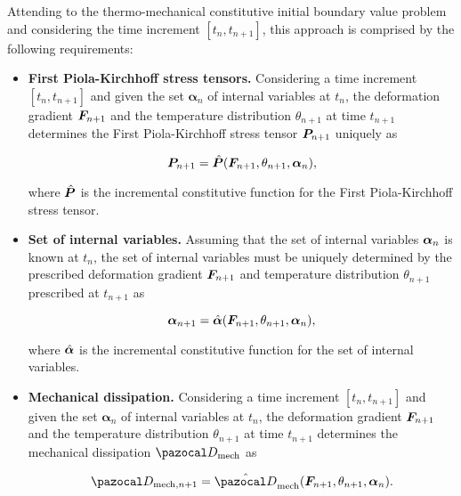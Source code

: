 Attending to the thermo-mechanical constitutive initial boundary value problem and considering the time increment $[t_n, t_{n+1}]$, this approach is comprised by the following requirements:
\begin{itemize}
    \item \textbf{First Piola-Kirchhoff stress tensors.} Considering a time increment $[t_n, t_{n+1}]$ and given the set $\bm \alpha_n$ of internal variables at $t_n$, the deformation gradient $\bm{F}_{n+1}$ and the temperature distribution \(\theta_{n+1}\) at time $t_{n+1}$ determines the First Piola-Kirchhoff stress tensor $\bm{P}_{n+1}$ uniquely as
        \begin{highlight}
    \begin{equation}
        \bm{P}_{n+1} = \hat{\bm{P}}(\bm{F}_{n+1}, \theta_{n+1}, \bm{\alpha}_n),
    \end{equation}
        \end{highlight}
    where $\hat{\bm{P}}$ is the incremental constitutive function for the First Piola-Kirchhoff stress tensor.
    \item \textbf{Set of internal variables.} Assuming that the set of internal variables $\bm{\alpha}_n$ is known at $t_n$, the set of internal variables must be uniquely determined by the prescribed deformation gradient $\bm{F}_{n+1}$ and temperature distribution \(\theta_{n+1}\) prescribed at $t_{n+1}$ as
    \begin{highlight}
        \begin{equation}
             \bm{\alpha}_{n+1} =\hat{\bm{\alpha}}(\bm{F}_{n+1}, \theta_{n+1}, \bm{\alpha}_n), \label{eq:incremental_flux}
        \end{equation}
    \end{highlight}
    where $\hat{\bm{\alpha}}$ is the incremental constitutive function for the set of internal variables.

    \item \textbf{Mechanical dissipation.} 
 Considering a time increment $[t_n, t_{n+1}]$ and given the set $\bm \alpha_n$ of internal variables at $t_n$, the deformation gradient $\bm{F}_{n+1}$ and the temperature distribution \(\theta_{n+1}\) at time $t_{n+1}$ determines the mechanical dissipation \(\pazocal D_\text{mech}\) as
    \begin{highlight}
    \begin{equation}
    \pazocal D_{\text{mech},n+1} = \hat{\pazocal D}_\text{mech}(\bm F_{n+1}, \theta_{n+1}, \bm \alpha_n).
    \end{equation}
    \end{highlight}


\end{itemize}
